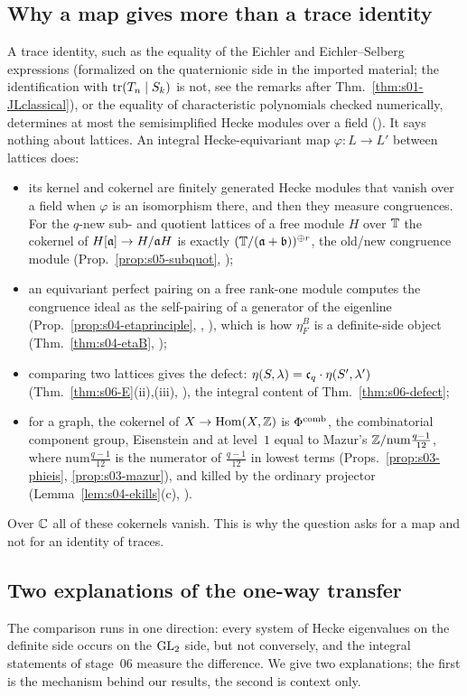 \subsection{Why a map gives more than a trace identity}\label{ss:s00-map}
A trace identity, such as the equality of the Eichler and Eichler--Selberg expressions (formalized on the quaternionic side in
the imported material; the identification with $\operatorname{tr}(T_n\mid S_k)$ is not, see the remarks after Thm.~\ref{thm:s01-JLclassical}), or the
equality of characteristic polynomials checked numerically, determines at most the semisimplified Hecke modules over a
field (\stknown). It says nothing about lattices. An integral Hecke-equivariant map $\varphi:L\to L'$ between lattices does:
\begin{itemize}
\item its kernel and cokernel are finitely generated Hecke modules that vanish over a field when $\varphi$ is an isomorphism
  there, and then they measure congruences. For the $q$-new sub- and quotient lattices of a free module $H$ over $\mathbb{T}$ the cokernel of $H[\mathfrak{a}]\to H/\mathfrak{a} H$ is exactly
  $(\mathbb{T}/(\mathfrak{a}+\mathfrak{b}))^{\oplus r}$, the old/new congruence module (Prop.~\ref{prop:s05-subquot}, \stproved);
\item an equivariant perfect pairing on a free rank-one module computes the congruence ideal as the self-pairing of a generator
  of the eigenline (Prop.~\ref{prop:s04-etaprinciple}, \stproved, \stformal), which is how $\eta^B_F$ is a definite-side object
  (Thm.~\ref{thm:s04-etaB}, \stcited);
\item comparing two lattices gives the defect: $\eta(S,\lambda)=\mathfrak{c}_q\cdot\eta(S',\lambda')$ (Thm.~\ref{thm:s06-E}(ii),(iii), \stproved),
  the integral content of Thm.~\ref{thm:s06-defect};
\item for a graph, the cokernel of $X\to\operatorname{Hom}(X,\mathbb{Z})$ is $\Phi^{\mathrm{comb}}$, the combinatorial component group, Eisenstein and at level~$1$ equal to
  Mazur's $\mathbb{Z}/\mathrm{num}\frac{q-1}{12}$, where $\mathrm{num}\frac{q-1}{12}$ is the numerator of $\frac{q-1}{12}$ in lowest terms (Props.~\ref{prop:s03-phieis}, \ref{prop:s03-mazur}), and killed by the ordinary projector
  (Lemma~\ref{lem:s04-ekills}(c), \stproved).
\end{itemize}
Over $\mathbb{C}$ all of these cokernels vanish. This is why the question asks for a map and not for an identity of traces.

\subsection{Two explanations of the one-way transfer}\label{ss:s00-oneway}
The comparison runs in one direction: every system of Hecke eigenvalues on the definite side occurs on the $\mathrm{GL}_2$ side, but not
conversely, and the integral statements of stage~06 measure the difference. We give two explanations; the first is the
mechanism behind our results, the second is context only.

